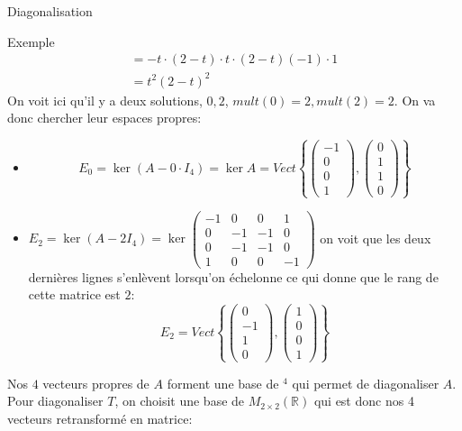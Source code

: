\begin{parag}{Diagonalisation}
\begin{subparag}{Exemple}
\begin{align*}
            = -t\cdot(2-t)\cdot t \cdot (2-t)(-1)\cdot 1\\
            = t^2(2-t)^2
            \end{align*}
            On voit ici qu'il y a deux solutions, $0, 2$, $mult(0) = 2, mult(2)=2$. On va donc chercher leur espaces propres:
            \begin{itemize}
                \item \[E_0 = \ker(A - 0\cdot I_4) = \ker A = Vect\left\{\begin{pmatrix}
                    -1\\0\\0\\1
                \end{pmatrix}, \begin{pmatrix}
                    0\\1\\1\\0
                \end{pmatrix}\right\}\]
                \item $E_2 = \ker(A - 2I_4) = \ker \begin{pmatrix}
                    -1 & 0 & 0 & 1\\
                    0 & -1 & -1 & 0\\
                    0 & -1 & -1 & 0\\
                    1 & 0 & 0 & -1
                \end{pmatrix}$ on voit que les deux dernières lignes s'enlèvent lorsqu'on échelonne ce qui donne que le rang de cette matrice est $2$:
                \\
                \[E_2 = Vect \left\{\begin{pmatrix}
                    0\\-1\\1\\0
                \end{pmatrix}, \begin{pmatrix}
                    1 \\0\\0\\1
                \end{pmatrix}\right\}\]
            \end{itemize}
            Nos $4$ vecteurs propres de $A$ forment une base de \R$^4$ qui permet de diagonaliser $A$. Pour diagonaliser $T$, on choisit une base de $M_{2\times 2}(\mathbb{R})$ qui est donc nos 4 vecteurs retransformé en matrice:

\end{subparag}
\end{parag}
